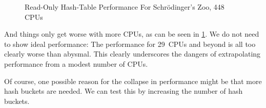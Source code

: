\begin{figure}
\centering
{}
\caption{Read-Only Hash-Table Performance For Schr\"odinger's Zoo, 448 CPUs}
\label{fig:datastruct:Read-Only Hash-Table Performance For Schroedinger's Zoo; 448 CPUs}
\end{figure}

And things only get worse with more CPUs, as can be seen in
\cref{fig:datastruct:Read-Only Hash-Table Performance For Schroedinger's Zoo; 448 CPUs}.
We do not need to show ideal performance:
The performance for 29~CPUs and beyond is all too clearly worse than abysmal.
This clearly underscores the dangers of extrapolating performance from a
modest number of CPUs.

Of course, one possible reason for the collapse in performance might be
that more hash buckets are needed.
We can test this by increasing the number of hash buckets.

\QuickQuizEnd



